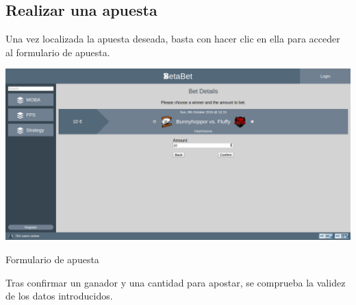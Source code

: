 \documentclass{article}
\begin{document}
\subsection{Realizar una apuesta}
Una vez localizada la apuesta deseada, basta con hacer clic en ella para acceder al formulario de apuesta.
\smallskip\newline
\begin{minipage}{\linewidth}
    \centering
    \captionsetup{type=figure}
    \includegraphics[width=\linewidth]{fig5}
    \caption{Formulario de apuesta}
    \label{fig:fig5}
\end{minipage}
\smallskip\newline
Tras confirmar un ganador y una cantidad para apostar, se comprueba la validez de los datos introducidos.
\end{document}
